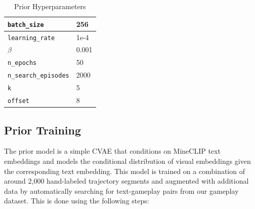 \begin{table}[h]
\begin{minipage}[b]{0.45\textwidth}
\begin{tabular}{|l|l|}
            \texttt{batch\_size} & 256 \\ \hline
            \texttt{learning\_rate} & 1e-4 \\ \hline
            $\beta$ & 0.001 \\ \hline
            \texttt{n\_epochs} & 50 \\ \hline
            \texttt{n\_search\_episodes} & 2000 \\ \hline
            \texttt{k} & 5 \\ \hline
            \texttt{offset} & 8 \\ \hline
        \end{tabular}
        \vspace{0.5em}
        \caption{Prior Hyperparameters}
        \label{table:prior_hparams}
    \end{minipage}
\end{table}


\begin{algorithm}[h!]
\DontPrintSemicolon



\caption{Sampling Episode Segments with \textbf{Packed Hindsight Relabeling}}
\label{algo:hindsight}
\end{algorithm}

\subsection{Prior Training}
\label{sec:prior}
The prior model is a simple CVAE \citep{cvae} that conditions on MineCLIP \citep{fan2022minedojo} text embeddings and models the conditional distribution of visual embeddings given the corresponding text embedding. This model is trained on a combination of around 2,000 hand-labeled trajectory segments and augmented with additional data by automatically searching for text-gameplay pairs from our gameplay dataset. This is done using the following steps:

